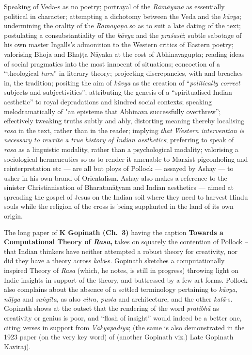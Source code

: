 Speaking of Veda-s as no poetry; portrayal of the \textsl{Rāmāyaṇa} as essentially political in character; attempting a dichotomy between the Veda and the \textsl{kāvya}; undermining the orality of the \textsl{Rāmāyaṇa} so as to suit a late dating of the text; postulating a consubstantiality of the \textsl{kāvya} and the \textsl{praśasti}; subtle sabotage of his own master Ingalls's admonition to the Western critics of Eastern poetry; valorising Bhoja and Bhaṭṭa Nāyaka at the cost of Abhinavagupta; reading ideas of social pragmatics into the most innocent of situations; concoction of a “theological \textsl{turn}” in literary theory; projecting discrepancies, with and breaches in, the tradition; positing the aim of \textsl{kāvya} as the creation of “\textsl{politically correct} subjects and subjectivities''; attributing the genesis of a “spiritualised Indian aesthetic” to royal depradations and kindred social contexts; speaking melodramatically of "an episteme that Abhinava successfully overthrew”; effectively tweaking truths subtly and ably, distorting meaning thereby localising \textsl{rasa} in the text, rather than in the reader; implying \textsl{that Western intervention is necessary to rewrite a true history of Indian aesthetics}; preferring to speak of \textsl{rasa} as a linguistic modality, rather than a psychological modality; valorising a sociological hermeneutics so as to render it amenable to Marxist pigeonholing and reinterpretation etc --- are all but ploys of Pollock --- assayed by Ashay --- to usher in his own brand of Orientalism. Ashay also makes a reference to the sinister Christianisation of Bharatanāṭyam and Indian aesthetics --- aimed at spreading the gospel of Jesus on the Indian soil where they need to harvest Hindu souls while the religion of the cross is being supplanted in the land of its own origin.

The long paper of {\bf K Gopinath (Ch.~3)} having the caption {\bf Towards a Computational Theory of {\sl\bfseries Rasa},} takes on squarely the contention of Pollock -- that Indian thinkers have neither attempted a robust theory for creativity, nor did they have a theory across \textsl{kalā}-s. Gopinath sketches a computationally inspired Theory of \textsl{Rasa} (which, he notes, is still in progress) throwing light on Indic insights in support of the theory, and buttressed by a few art forms. Pollock also complains about the absence of a settled terminology pertaining to \textsl{kāvya, nāṭya} and \textsl{saṅgīta}, as also \textsl{citra, pusta} and architecture, and the other \textsl{kalā}-s. Gopinath shows at the outset that the rendering of the word \textsl{pratibhā} as creativity or genius is poor, and “flash of insight” would indeed be a better one, citing verses in support from \textsl{Vākyapadīya}; (the same is also demonstrated in the 1923 paper (on the very key word) of (another Gopinath viz.) Late Gopinath Kaviraj).

